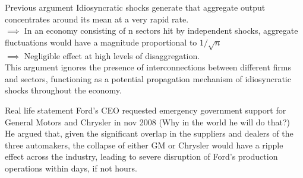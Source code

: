 \documentclass[dvipsnames]{beamer}
\begin{document}


\begin{frame}{Previous argument}
    \justifying
    Idiosyncratic shocks generate that aggregate output concentrates around its mean at a very rapid rate.\\[5pt]
    $\implies$  In an economy consisting of n sectors hit by independent shocks, aggregate fluctuations 
    would have a magnitude proportional to $1/ \sqrt{n}$\\[5pt]
    $\implies$ Negligible effect at
    high levels of disaggregation.\\[10pt]
    
    This argument ignores the presence of interconnections between
    different firms and sectors, functioning as a potential propagation mechanism
    of idiosyncratic shocks throughout the economy.\\
\end{frame}


\begin{frame}{Real life statement}
    \justifying
    Ford's CEO requested emergency government support for General Motors and
    Chrysler in nov 2008 (Why in the world he will do that?)\\[10pt]
    
    He argued that, given the significant
    overlap in the suppliers and dealers of the three automakers, the collapse of
    either GM or Chrysler would have a ripple effect across the industry, leading
    to severe disruption of Ford’s production operations within days, if not hours.\\
\end{frame}
\end{document}
